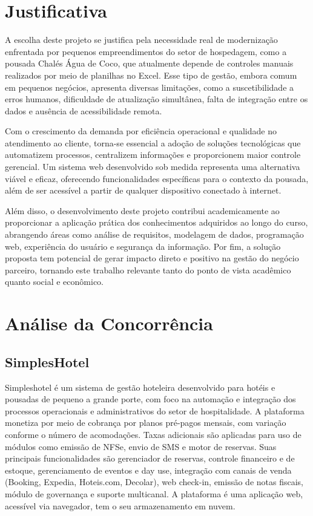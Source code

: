 \documentclass[
	12pt,				%
	openany,			%
	twoside,			%
	a4paper,			%
	english,			%
	french,				%
	spanish,			%
	brazil				%
	]{abntex2}
\begin{document}
\section{Justificativa}
A escolha deste projeto se justifica pela necessidade real de modernização enfrentada por pequenos empreendimentos do setor de hospedagem, como a pousada Chalés Água de Coco, que atualmente depende de controles manuais realizados por meio de planilhas no Excel. Esse tipo de gestão, embora comum em pequenos negócios, apresenta diversas limitações, como a suscetibilidade a erros humanos, dificuldade de atualização simultânea, falta de integração entre os dados e ausência de acessibilidade remota.

Com o crescimento da demanda por eficiência operacional e qualidade no atendimento ao cliente, torna-se essencial a adoção de soluções tecnológicas que automatizem processos, centralizem informações e proporcionem maior controle gerencial. Um sistema web desenvolvido sob medida representa uma alternativa viável e eficaz, oferecendo funcionalidades específicas para o contexto da pousada, além de ser acessível a partir de qualquer dispositivo conectado à internet.

Além disso, o desenvolvimento deste projeto contribui academicamente ao proporcionar a aplicação prática dos conhecimentos adquiridos ao longo do curso, abrangendo áreas como análise de requisitos, modelagem de dados, programação web, experiência do usuário e segurança da informação. Por fim, a solução proposta tem potencial de gerar impacto direto e positivo na gestão do negócio parceiro, tornando este trabalho relevante tanto do ponto de vista acadêmico quanto social e econômico.

\section{Análise da Concorrência}
\subsection{SimplesHotel}
Simpleshotel é um sistema de gestão hoteleira desenvolvido para hotéis e pousadas de pequeno a grande porte, com foco na automação e integração dos processos operacionais e administrativos do setor de hospitalidade.
A plataforma monetiza por meio de cobrança por planos pré-pagos mensais, com variação conforme o número de acomodações. Taxas adicionais são aplicadas para uso de módulos como emissão de NFSe, envio de SMS e motor de reservas.
Suas principais funcionalidades são gerenciador de reservas, controle financeiro e de estoque, gerenciamento de eventos e day use, integração com canais de venda (Booking, Expedia, Hoteis.com, Decolar), web check-in, emissão de notas fiscais, módulo de governança e suporte multicanal.
A plataforma é uma aplicação web, acessível via navegador, tem o seu armazenamento em nuvem.
\end{document}
